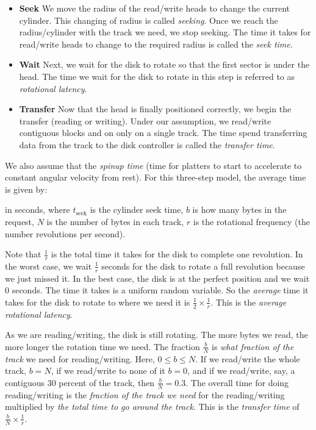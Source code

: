 \begin{itemize}   
\renewcommand{\labelitemi}{$\Box$}
\item \textbf{Seek}
We move the radius of the read/write heads to change the current cylinder.
This changing of radius is called \textit{seeking}. Once we reach the 
radius/cylinder with the track we need, we stop seeking.
The time it takes for read/write heads to change to the required radius is 
called the \textit{seek time}.
\item \textbf{Wait}
Next, we wait for the disk to rotate so that the first sector is under the head.
The time we wait for the disk to rotate in this step is referred to as 
\textit{rotational latency}.
\item \textbf{Transfer}
Now that the head is finally positioned correctly, we begin the transfer 
(reading or writing). Under our assumption, we read/write contiguous blocks 
and on only on a single track.
The time spend transferring data from the track to the disk controller
is called the \textit{transfer time}.
\end{itemize}

We also assume that the \textit{spinup time} 
(time for platters to start to accelerate to constant angular velocity from rest).
For this three-step model, the average time is given by:


in seconds, where $t_{\text{seek}}$ is the cylinder seek time,
$b$ is how many bytes in the request, $N$ is the number of bytes in each track, 
$r$ is the rotational frequency (the number revolutions per second).

Note that $\frac{1}{r}$ is the total time it takes for the disk to complete one revolution. 
In the worst case, we wait $\frac{1}{r}$ seconds for the disk to rotate a full revolution 
because we just missed it. In the best case, the disk is at the perfect position and we 
wait 0 seconds. The time it takes is a uniform random variable. So the \textit{average} time 
it takes for the disk to rotate to where we need it is  
$\frac{1}{2} \times \frac{1}{r}$. This is the \textit{average rotational latency}. 

As we are reading/writing, the disk is still rotating. 
The more bytes we read, the more longer the rotation time we 
need. The fraction $\frac{b}{N}$ is \textit{what fraction of the track} we need for 
reading/writing. Here, $0 \leqslant b \leqslant N$. If we read/write the whole track, $b = N$, 
if we read/write to none of it $b = 0$, and if we 
read/write, say, a contiguous 30 percent of the track, then $\frac{b}{N} = 0.3$. 
The overall time for doing reading/writing is the \textit{fraction of the track we need} 
for the reading/writing multiplied by \textit{the total time to go around the track}.
This is the \textit{transfer time} of $\frac{b}{N} \times \frac{1}{r}$. 

